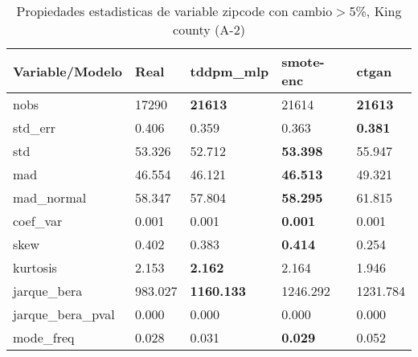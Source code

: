 \begin{table}[H]
\centering
\fontsize{8}{14}\selectfont
\caption{Propiedades estadisticas de variable zipcode con cambio\ensuremath{>}5\%, King county (A-2)}
\label{table-stats-king county-a-2-zipcode-short}
\begin{tabular}{|l|m{10em}|m{10em}|m{10em}|m{10em}|}
\hline
 \rowcolor[gray]{0.8}
Variable/Modelo & Real & tddpm\_mlp & smote-enc & ctgan \\
\hline nobs & 17290 & \bfseries 21613 & \cellcolor[rgb]{0.9, 0.54, 0.52} 21614 & \bfseries 21613 \\
\hline std\_err & 0.406 & \cellcolor[rgb]{0.9, 0.54, 0.52} 0.359 & 0.363 & \bfseries 0.381 \\
\hline std & 53.326 & 52.712 & \bfseries 53.398 & \cellcolor[rgb]{0.9, 0.54, 0.52} 55.947 \\
\hline mad & 46.554 & 46.121 & \bfseries 46.513 & \cellcolor[rgb]{0.9, 0.54, 0.52} 49.321 \\
\hline mad\_normal & 58.347 & 57.804 & \bfseries 58.295 & \cellcolor[rgb]{0.9, 0.54, 0.52} 61.815 \\
\hline coef\_var & 0.001 & 0.001 & \bfseries 0.001 & \cellcolor[rgb]{0.9, 0.54, 0.52} 0.001 \\
\hline skew & 0.402 & 0.383 & \bfseries 0.414 & \cellcolor[rgb]{0.9, 0.54, 0.52} 0.254 \\
\hline kurtosis & 2.153 & \bfseries 2.162 & 2.164 & \cellcolor[rgb]{0.9, 0.54, 0.52} 1.946 \\
\hline jarque\_bera & 983.027 & \bfseries 1160.133 & \cellcolor[rgb]{0.9, 0.54, 0.52} 1246.292 & 1231.784 \\
\hline jarque\_bera\_pval & 0.000 & 0.000 & 0.000 & 0.000 \\
\hline mode\_freq & 0.028 & 0.031 & \bfseries 0.029 & \cellcolor[rgb]{0.9, 0.54, 0.52} 0.052 \\
\hline
\end{tabular}
\end{table}
